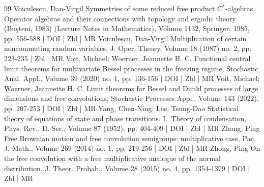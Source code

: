 \documentclass[10pt]{amsart}
\theoremstyle{definition}\newtheorem{defi}[theo]{Definition}\newtheorem{rema}[theo]{Remark}\newtheorem{exam}[theo]{Example}\newtheorem{exem}[theo]{Example}\newtheorem{nota}[theo]{Notation}
\begin{document}
\begin{thebibliography}{99}
Voiculescu, Dan-Virgil Symmetries of some reduced free product ${C}^\ast $-algebras, Operator algebras and their connections with topology and ergodic theory (Buşteni, 1983) (Lecture Notes in Mathematics), Volume 1132, Springer, 1985, pp. 556-588 | DOI | Zbl | MR
Voiculescu, Dan-Virgil Multiplication of certain noncommuting random variables, J. Oper. Theory, Volume 18 (1987) no. 2, pp. 223-235 | Zbl | MR
Voit, Michael; Woerner, Jeannette H. C. Functional central limit theorems for multivariate Bessel processes in the freezing regime, Stochastic Anal. Appl., Volume 39 (2020) no. 1, pp. 136-156 | DOI | Zbl | MR
Voit, Michael; Woerner, Jeannette H. C. Limit theorems for Bessel and Dunkl processes of large dimensions and free convolutions, Stochastic Processes Appl., Volume 143 (2022), pp. 207-253 | DOI | Zbl | MR
Yang, Chen-Ning; Lee, Tsung-Dao Statistical theory of equations of state and phase transitions. I. Theory of condensation, Phys. Rev., II. Ser., Volume 87 (1952), pp. 404-409 | DOI | Zbl | MR
Zhong, Ping Free Brownian motion and free convolution semigroups: multiplicative case, Pac. J. Math., Volume 269 (2014) no. 1, pp. 219-256 | DOI | Zbl | MR
Zhong, Ping On the free convolution with a free multiplicative analogue of the normal distribution, J. Theor. Probab., Volume 28 (2015) no. 4, pp. 1354-1379 | DOI | Zbl | MR
\end{thebibliography}
\end{document}
